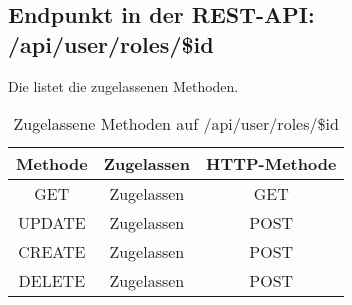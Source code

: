 \subsection{Endpunkt in der REST-API: /api/user/roles/\$id}
Die  listet die zugelassenen Methoden. 

\begin{table}[!htbp]
	\begin{tabular}{|c|c|c|}
		\hline
			\textbf{Methode} & \textbf{Zugelassen} & \textbf{HTTP-Methode} \\ \hline
			GET & Zugelassen & GET \\ \hline
			UPDATE & Zugelassen & POST \\ \hline 
			CREATE & Zugelassen & POST \\ \hline 
			DELETE & Zugelassen & POST \\ \hline
	\end{tabular}

		\caption{Zugelassene Methoden auf /api/user/roles/\$id}
		\label{tab:end:rest:api:user:roles:id:meth}
\end{table}